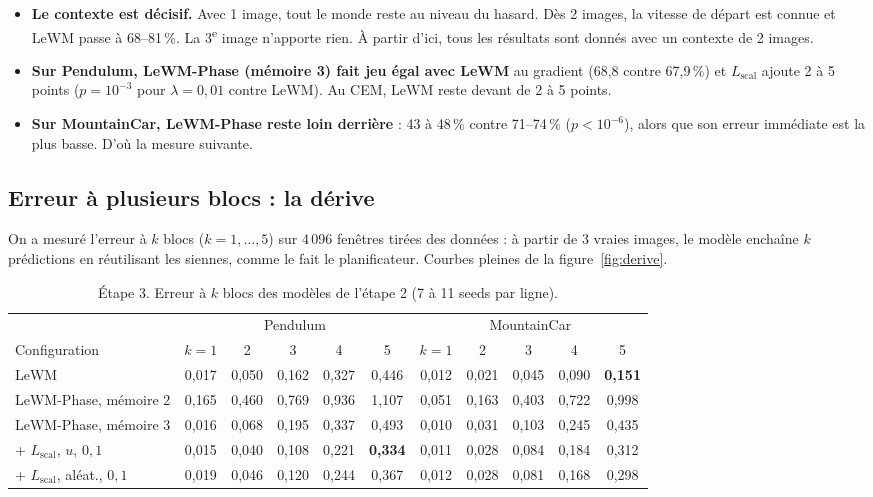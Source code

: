 \documentclass[11pt,a4paper]{article}
\newcommand{\Lscal}{L_{\mathrm{scal}}}
\begin{document}
\begin{itemize}
  \item \textbf{Le contexte est décisif.} Avec 1 image, tout le monde reste au niveau du
  hasard. Dès 2 images, la vitesse de départ est connue et LeWM passe à 68--81\,\%. La
  3\textsuperscript{e} image n'apporte rien. À partir d'ici, tous les résultats sont donnés avec
  un contexte de 2 images.
  \item \textbf{Sur Pendulum, LeWM-Phase (mémoire 3) fait jeu égal avec LeWM} au gradient
  (68,8 contre 67,9\,\%) et $\Lscal$ ajoute 2 à 5 points
  ($p = 10^{-3}$ pour $\lambda = 0{,}01$ contre LeWM). Au CEM, LeWM reste devant de 2 à 5 points.
  \item \textbf{Sur MountainCar, LeWM-Phase reste loin derrière} : 43 à 48\,\% contre 71--74\,\%
  ($p < 10^{-6}$), alors que son erreur immédiate est la plus basse. D'où la mesure suivante.
\end{itemize}

\subsection{Erreur à plusieurs blocs : la dérive}

On a mesuré l'erreur à $k$ blocs ($k = 1, \ldots, 5$) sur 4\,096 fenêtres tirées des données :
à partir de 3 vraies images, le modèle enchaîne $k$ prédictions en réutilisant les siennes,
comme le fait le planificateur. Courbes pleines de la figure~\ref{fig:derive}.

\begin{table}[htbp]
\centering\small
\begin{tabular}{@{}lccccc|ccccc@{}}
\toprule
& \multicolumn{5}{c|}{Pendulum} & \multicolumn{5}{c}{MountainCar} \\
Configuration & $k{=}1$ & 2 & 3 & 4 & 5 & $k{=}1$ & 2 & 3 & 4 & 5 \\
\midrule
LeWM                         & 0,017 & 0,050 & 0,162 & 0,327 & 0,446 & 0,012 & 0,021 & 0,045 & 0,090 & \textbf{0,151} \\
LeWM-Phase, mémoire 2            & 0,165 & 0,460 & 0,769 & 0,936 & 1,107 & 0,051 & 0,163 & 0,403 & 0,722 & 0,998 \\
LeWM-Phase, mémoire 3            & 0,016 & 0,068 & 0,195 & 0,337 & 0,493 & 0,010 & 0,031 & 0,103 & 0,245 & 0,435 \\
\quad + $\Lscal$, $u$, $0{,}1$  & 0,015 & 0,040 & 0,108 & 0,221 & \textbf{0,334} & 0,011 & 0,028 & 0,084 & 0,184 & 0,312 \\
\quad + $\Lscal$, aléat., $0{,}1$ & 0,019 & 0,046 & 0,120 & 0,244 & 0,367 & 0,012 & 0,028 & 0,081 & 0,168 & 0,298 \\
\bottomrule
\end{tabular}
\caption{Étape 3. Erreur à $k$ blocs des modèles de l'étape 2 (7 à 11 seeds par ligne).}
\label{tab:derive}
\end{table}
\end{document}
